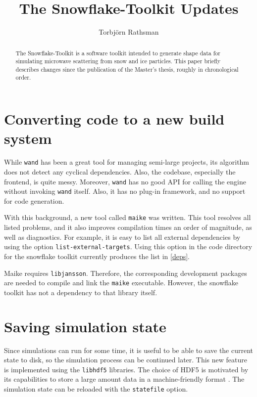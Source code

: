 \documentclass[a4paper,10pt]{scrartcl}
\title{The Snowflake-Toolkit Updates}
\author{Torbjörn Rathsman}
\newcommand{\prgname}[1]{\texttt{#1}}
\begin{document}
\maketitle
\begin{abstract}
The Snowflake-Toolkit is a software toolkit intended to generate shape data for simulating microwave scattering from snow and ice particles. This paper briefly describes changes since the publication of the Master's thesis, roughly in chronological order. 
\end{abstract}



\tableofcontents

\section{Converting code to a new build system}
While \prgname{wand} has been a great tool for managing semi-large projects, its algorithm does not detect any cyclical dependencies. Also, the codebase, especially the frontend, is quite messy. Moreover, \prgname{wand} has no good API for calling the engine without invoking \prgname{wand} itself. Also, it has no plug-in framework, and no support for code generation.

With this background, a new tool called \prgname{maike}\cite{maike} was written. This tool resolves all listed problems, and it also improves compilation times an order of magnitude, as well as diagnostics. For example, it is easy to list all external dependencies by using the option \texttt{list-external-targets}\cite{maikecmd}. Using this option in the code directory for the snowflake toolkit currently produces the list in \cref{deps}.

Maike requires \prgname{libjansson}\cite{maike}\cite{jansson}. Therefore, the corresponding development packages are needed to compile and link the \prgname{maike} executable. However, the snowflake toolkit has not a dependency to that library itself.

\section{Saving simulation state}
Since simulations can run for some time, it is useful to be able to save the current state to disk, so the simulation process can be continued later. This new feature is implemented using the \prgname{libhdf5} libraries. The choice of HDF5 is motivated by its capabilities to store a large amount data in a machine-friendly format \cite{hdf5}. The simulation state can be reloaded with the \texttt{statefile} option.
\end{document}
